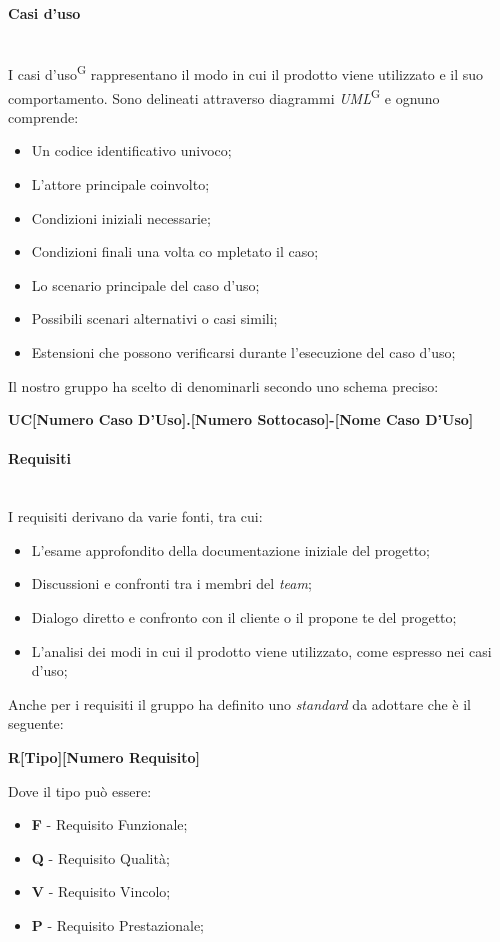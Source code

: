 \documentclass[5pt]{article}
\begin{document}
\paragraph{Casi d'uso}~\\
I casi d'uso\textsuperscript{G} rappresentano il modo in cui il prodotto viene utilizzato e il suo comportamento. Sono delineati attraverso diagrammi \textit{UML}\textsuperscript{G} e ognuno comprende:
\begin{itemize}
    \item Un codice identificativo univoco;
    \item L'attore principale coinvolto;
    \item Condizioni iniziali necessarie;
    \item Condizioni finali una volta co mpletato il caso;
    \item Lo scenario principale del caso d'uso;
    \item Possibili scenari alternativi o casi simili;
    \item Estensioni che possono verificarsi durante l'esecuzione del caso d'uso;
\end{itemize}
Il nostro gruppo ha scelto di denominarli secondo uno schema preciso: 
\begin{center}
    \textbf{UC[Numero Caso D'Uso].[Numero Sottocaso]-[Nome Caso D'Uso]}
\end{center}

\paragraph{Requisiti}~\\
I requisiti derivano da varie fonti, tra cui:

\begin{itemize}
    \item L'esame approfondito della documentazione iniziale del progetto;
    \item Discussioni e confronti tra i membri del \textit{team};
    \item Dialogo diretto e confronto con il cliente o il propone te del progetto;
    \item L'analisi dei modi in cui il prodotto viene utilizzato, come espresso nei casi d'uso;
\end{itemize}
Anche per i requisiti il gruppo ha definito uno \textit{standard} da adottare che è il seguente:
\begin{center}
    \textbf{R[Tipo][Numero Requisito]}
\end{center}
Dove il tipo può essere:
\begin{itemize}
    \item \textbf{F} - Requisito Funzionale;
    \item \textbf{Q} - Requisito Qualità;
    \item \textbf{V} - Requisito Vincolo;
    \item \textbf{P} - Requisito Prestazionale;
\end{itemize}
\end{document}
